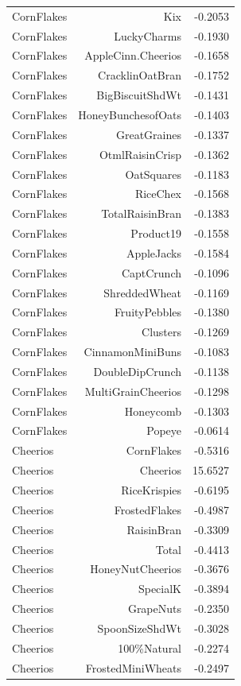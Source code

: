 \begin{longtable}{@{}lrr@{}}
CornFlakes & Kix & -0.2053 \\
CornFlakes & LuckyCharms & -0.1930 \\
CornFlakes & AppleCinn.Cheerios & -0.1658 \\
CornFlakes & CracklinOatBran & -0.1752 \\
CornFlakes & BigBiscuitShdWt & -0.1431 \\
CornFlakes & HoneyBunchesofOats & -0.1403 \\
CornFlakes & GreatGraines & -0.1337 \\
CornFlakes & OtmlRaisinCrisp & -0.1362 \\
CornFlakes & OatSquares & -0.1183 \\
CornFlakes & RiceChex & -0.1568 \\
CornFlakes & TotalRaisinBran & -0.1383 \\
CornFlakes & Product19 & -0.1558 \\
CornFlakes & AppleJacks & -0.1584 \\
CornFlakes & CaptCrunch & -0.1096 \\
CornFlakes & ShreddedWheat & -0.1169 \\
CornFlakes & FruityPebbles & -0.1380 \\
CornFlakes & Clusters & -0.1269 \\
CornFlakes & CinnamonMiniBuns & -0.1083 \\
CornFlakes & DoubleDipCrunch & -0.1138 \\
CornFlakes & MultiGrainCheerios & -0.1298 \\
CornFlakes & Honeycomb & -0.1303 \\
CornFlakes & Popeye & -0.0614 \\
Cheerios & CornFlakes & -0.5316 \\
Cheerios & Cheerios & 15.6527 \\
Cheerios & RiceKrispies & -0.6195 \\
Cheerios & FrostedFlakes & -0.4987 \\
Cheerios & RaisinBran & -0.3309 \\
Cheerios & Total & -0.4413 \\
Cheerios & HoneyNutCheerios & -0.3676 \\
Cheerios & SpecialK & -0.3894 \\
Cheerios & GrapeNuts & -0.2350 \\
Cheerios & SpoonSizeShdWt & -0.3028 \\
Cheerios & 100\%Natural & -0.2274 \\
Cheerios & FrostedMiniWheats & -0.2497 \\

\end{longtable}

